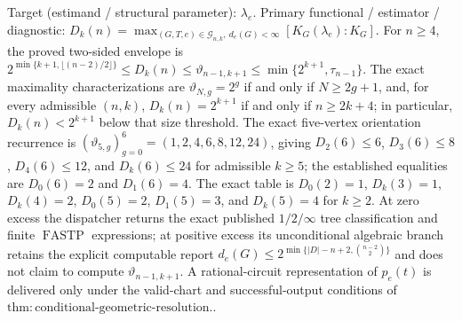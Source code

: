 \documentclass{article}
\begin{document}
Target (estimand / structural parameter): \(\lambda_e\).
Primary functional / estimator / diagnostic: \(D_k(n)=\max_{(G,T,e)\in\mathcal G_{n,k},\ d_e(G)<\infty}[K_G(\lambda_e):K_G]\). For \(n\geq4\), the proved two-sided envelope is \(2^{\min\{k+1,\lfloor(n-2)/2\rfloor\}}\leq D_k(n)\leq\vartheta_{n-1,k+1}\leq\min\{2^{k+1},\tau_{n-1}\}\). The exact maximality characterizations are \(\vartheta_{N,g}=2^g\) if and only if \(N\geq2g+1\), and, for every admissible \((n,k)\), \(D_k(n)=2^{k+1}\) if and only if \(n\geq2k+4\); in particular, \(D_k(n)<2^{k+1}\) below that size threshold. The exact five-vertex orientation recurrence is \((\vartheta_{5,g})_{g=0}^{6}=(1,2,4,6,8,12,24)\), giving \(D_2(6)\leq6\), \(D_3(6)\leq8\), \(D_4(6)\leq12\), and \(D_k(6)\leq24\) for admissible \(k\geq5\); the established equalities are \(D_0(6)=2\) and \(D_1(6)=4\). The exact table is \(D_0(2)=1\), \(D_k(3)=1\), \(D_k(4)=2\), \(D_0(5)=2\), \(D_1(5)=3\), and \(D_k(5)=4\) for \(k\geq2\). At zero excess the dispatcher returns the exact published \(1/2/\infty\) tree classification and finite \(\operatorname{FASTP}\) expressions; at positive excess its unconditional algebraic branch retains the explicit computable report \(d_e(G)\leq2^{\min\{|D|-n+2,\binom{n-2}{2}\}}\) and does not claim to compute \(\vartheta_{n-1,k+1}\). A rational-circuit representation of \(p_e(t)\) is delivered only under the valid-chart and successful-output conditions of \(\mathrm{thm:conditional\mbox{-}geometric\mbox{-}resolution}\)..
\end{document}
